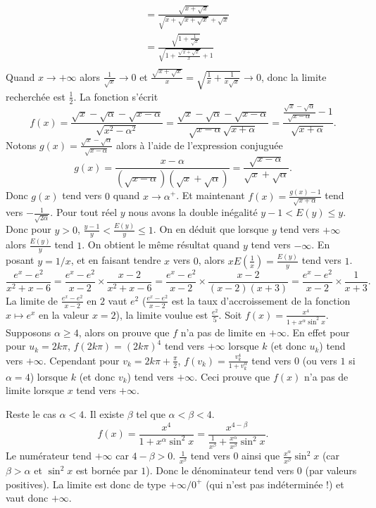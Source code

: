 {{\begin{align*}
  &= \frac{\sqrt{x+\sqrt x}}{\sqrt{x+\sqrt{x+\sqrt x}}+\sqrt x} \\
 &= \frac{\sqrt{1+\frac 1 {\sqrt x}}}{\sqrt{1+\frac{\sqrt{x+\sqrt x}}{x}}+1} \\
\end{align*}
Quand $x \rightarrow +\infty$ alors $\frac 1 {\sqrt x} \rightarrow 0$
et $\frac{\sqrt{x+\sqrt x}}{x}=\sqrt{\frac 1x + \frac{1}{x\sqrt{x}}}\rightarrow 0$, donc la limite recherch\'ee 
est $\frac 12$.
La fonction s'\'ecrit 
$$f(x) = \frac{\sqrt{x}-\sqrt{\alpha}-\sqrt{x-\alpha}}{\sqrt{x^2-\alpha^2}} = \frac{\sqrt x - \sqrt \alpha - \sqrt{x-\alpha}}{\sqrt{x-\alpha}\sqrt{x+\alpha}} = 
\frac{\frac{\sqrt x - \sqrt \alpha}{\sqrt{x-\alpha}}-1}{\sqrt{x+\alpha}}.$$
Notons $g(x) = \frac{\sqrt x - \sqrt \alpha}{\sqrt{x-\alpha}}$ alors 
\`a l'aide de l'expression conjugu\'ee $$g(x) = \frac{x -  \alpha}{(\sqrt{x-\alpha})(\sqrt x +\sqrt \alpha)} = \frac{\sqrt{x -  \alpha}}{\sqrt x +\sqrt \alpha}.$$
Donc $g(x)$ tend vers $0$ quand $x \rightarrow \alpha^+$. Et maintenant 
$f(x) = \frac{g(x)-1}{\sqrt{x+\alpha}}$ tend vers $-\frac {1}{\sqrt{2 \alpha}}$.
Pour tout r\'eel $y$ nous avons la double in\'egalit\'e $y-1 < E(y) \leq y$. Donc pour $y>0$,
$\frac{y-1}{y} < \frac{E(y)}{y} \leq 1$.
On en d\'eduit que lorsque $y$ tend vers $+\infty$  alors
$\frac{E(y)}{y}$ tend $1$. On obtient le même résultat quand $y$ tend vers $-\infty$. 
En posant $y = 1/x$, et en faisant tendre
$x$ vers $0$, alors $xE(\frac 1x) = \frac{E(y)}{y}$ tend vers $1$.
$$\frac {e^x-e^2}{x^2+x-6} = \frac {e^x-e^2}{x-2} \times \frac{x-2}{x^2+x-6} =\frac {e^x-e^2}{x-2} \times \frac{x-2}{(x-2)(x+3)} = \frac {e^x-e^2}{x-2} \times \frac{1}{x+3}.$$
La limite de $\frac {e^x-e^2}{x-2}$ en $2$ vaut $e^2$ ($\frac {e^x-e^2}{x-2}$ est la taux d'accroissement de la fonction $x \mapsto e^x$ en la valeur $x=2$), la limite voulue est $\frac {e^2}{5}$.
Soit $f(x) = \frac{x^4}{1+x^\alpha\sin^2x}$. Supposons $\alpha \geq 4$, alors on prouve que $f$ n'a pas de limite en $+\infty$.
En effet pour pour $u_k = 2k\pi$, $f(2k\pi) = (2k\pi)^4$ tend vers $+\infty$ lorsque $k$ (et donc $u_k$) tend vers $+\infty$.
Cependant pour $v_k = 2k\pi + \frac\pi 2$, $f(v_k) = \frac{v_k^4}{1+v_k^\alpha}$ tend vers $0$ (ou vers $1$ si $\alpha = 4$) lorsque $k$ (et donc $v_k$) tend vers $+\infty$. Ceci prouve que $f(x)$ n'a pas de limite lorsque $x$ tend vers $+\infty$.

Reste le cas $\alpha < 4$. Il existe $\beta$ tel que
$\alpha < \beta < 4$. 
$$f(x)= \frac {x^4}{1+x^\alpha \sin^2 x}= \frac {x^{4-\beta}}{\frac 1 {x^\beta} +\frac{x^\alpha}{x^\beta} \sin^2 x}.$$
Le num\'erateur tend $+\infty$ car $4-\beta >0$.
$\frac 1 {x^\beta}$ tend vers $0$ ainsi que $\frac{x^{\alpha}}{x^\beta} \sin^2 x$ (car $\beta > \alpha$ et $\sin^2 x$ est born\'ee par $1$). Donc le d\'enominateur tend vers $0$ (par valeurs positives). La limite est donc de type $+\infty / 0^+$ (qui n'est pas ind\'etermin\'ee !) et vaut donc $+\infty$.
}
}
